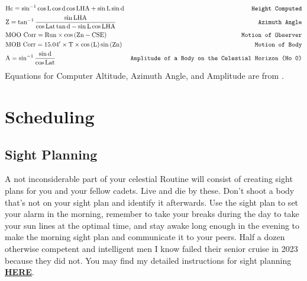 \documentclass[letterpaper,12pt]{article}
\begin{document}
\begin{align}
    &\text{Hc}=\sin^{-1}{\cos{\text{L}}\cos{\text{d}}\cos{\text{LHA}}+\sin{\text{L}}\sin{\text{d}}}  &\text{\texttt{Height Computed}}\\
    &\text{Z}=\tan^{-1}{\frac{\sin{\text{LHA}}}{\cos{\text{Lat}\tan\text{{d}}-\sin{\text{L}}\cos{\text{LHA}}}}}   &\text{\texttt{Azimuth Angle}}\\
    &\text{MOO Corr}=\text{Run}\times\cos{(\text{Zn}-\text{CSE})}  &\text{\texttt{Motion of Observer}}\\
    &\text{MOB Corr}=15.04'\times\text{T}\times\cos{(\text{L})}\sin{(\text{Zn})}   &\text{\texttt{Motion of Body}}\\
    &\text{A}=\sin^{-1}\frac{\sin{\text{d}}}{\cos{\text{Lat}}}	&\text{\texttt{Amplitude of a Body on the Celestial Horizon (Ho 0)}}
\end{align}
Equations for Computer Altitude, Azimuth Angle, and Amplitude are from .
\section{Scheduling}
\subsection{Sight Planning}
A not inconsiderable part of your celestial Routine will consist of creating sight plans for you and your fellow cadets. Live and die by these. Don't shoot a body that's not on your sight plan and identify it afterwards. Use the sight plan to set your alarm in the morning, remember to take your breaks during the day to take your sun lines at the optimal time, and stay awake long enough in the evening to make the morning sight plan and communicate it to your peers. Half a dozen otherwise competent and intelligent men I know failed their senior cruise in 2023 because they did not. You may find my detailed instructions for sight planning \hyperlink{https://www.csum.edu/tutoring/media/celnavjoey.pdf}{\textbf{HERE}}.
\end{document}
